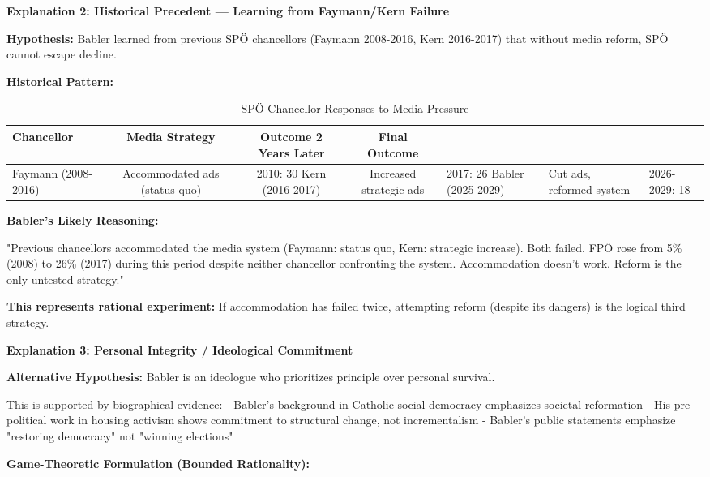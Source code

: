 \textbf{Explanation 2: Historical Precedent — Learning from Faymann/Kern Failure}

\textbf{Hypothesis:} Babler learned from previous SPÖ chancellors (Faymann 2008-2016, Kern 2016-2017) that
without media reform, SPÖ cannot escape decline.

\textbf{Historical Pattern:}

\begin{table}[h]
\centering
\caption{SPÖ Chancellor Responses to Media Pressure}
\label{tab:dx-spo-chancellor-responses}
\begin{tabular}{|l|c|c|c|}
\hline
\textbf{Chancellor} & \textbf{Media Strategy} & \textbf{Outcome 2 Years Later} & \textbf{Final Outcome} \\
\hline
Faymann (2008-2016) & Accommodated ads (status quo) & 2010: 30%
\hline
Kern (2016-2017) & Increased strategic ads & 2017: 26%
\hline
Babler (2025-2029) & Cut ads, reformed system & 2026-2029: 18%
\hline
\end{tabular}
\end{table}

\textbf{Babler's Likely Reasoning:}

"Previous chancellors accommodated the media system (Faymann: status quo, Kern: strategic increase).
Both failed. FPÖ rose from 5\% (2008) to 26\% (2017) during this period despite neither chancellor
confronting the system. Accommodation doesn't work. Reform is the only untested strategy."

\textbf{This represents rational experiment:} If accommodation has failed twice, attempting reform
(despite its dangers) is the logical third strategy.

\textbf{Explanation 3: Personal Integrity / Ideological Commitment}

\textbf{Alternative Hypothesis:} Babler is an ideologue who prioritizes principle over personal survival.

This is supported by biographical evidence:
- Babler's background in Catholic social democracy emphasizes societal reformation
- His pre-political work in housing activism shows commitment to structural change, not incrementalism
- Babler's public statements emphasize "restoring democracy" not "winning elections"

\textbf{Game-Theoretic Formulation (Bounded Rationality):}

